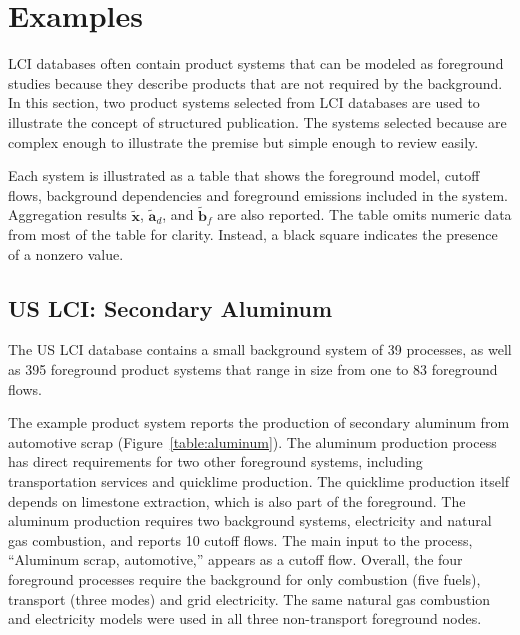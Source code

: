 \section{Examples}

LCI databases often contain product systems that can be modeled as foreground studies because they describe products that are not required by the background.  In this section, two product systems selected from LCI databases are used to illustrate the concept of structured publication.  The systems selected because are complex enough to illustrate the premise but simple enough to review easily.

Each system is illustrated as a table that shows the foreground model, cutoff flows, background dependencies and foreground emissions included in the system.  Aggregation results $\tilde{\mathbf{x}}$, $\tilde{\mathbf{a}}_d$, and $\tilde{\mathbf{b}}_f$ are also reported.  The table omits numeric data from most of the table for clarity. Instead, a black square indicates the presence of a nonzero value.  %

\subsection{US LCI: Secondary Aluminum}



The US LCI database contains a small background system of 39 processes, as well as 395 foreground product systems that range in size from one to 83 foreground flows.

The example product system  reports the production of secondary aluminum from automotive scrap (Figure~\ref{table:aluminum}).   The aluminum production process has direct requirements for two other foreground systems, including transportation services and quicklime production.  The quicklime production itself depends on limestone extraction, which is also part of the foreground.  The aluminum production requires two background systems, electricity and natural gas combustion, and reports 10 cutoff flows.  The main input to the process, ``Aluminum scrap, automotive,'' appears as a cutoff flow.  Overall, the four foreground processes require the background for only combustion (five fuels), transport (three modes) and grid electricity.  The same natural gas combustion and electricity models were used in all three non-transport foreground nodes.


